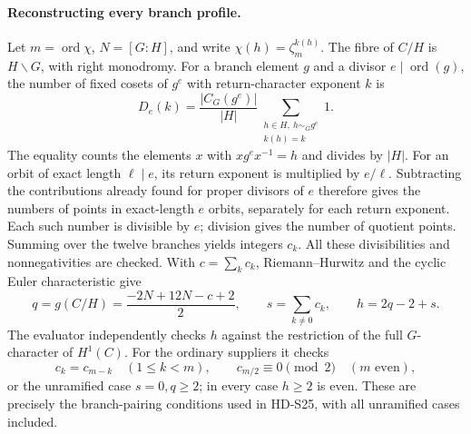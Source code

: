 \paragraph{Reconstructing every branch profile.}
Let \(m=\operatorname{ord}\chi\), \(N=[G:H]\), and write
\(\chi(h)=\zeta_m^{k(h)}\). The fibre of \(C/H\) is \(H\backslash G\),
with right monodromy. For a branch element \(g\) and a divisor
\(e\mid\operatorname{ord}(g)\), the number of fixed cosets of
\(g^e\) with return-character exponent \(k\) is
\[
 D_e(k)=\frac{|C_G(g^e)|}{|H|}
       \sum_{\substack{h\in H,\ h\sim_Gg^e\\k(h)=k}}1.
\]
The equality counts the elements \(x\) with \(xg^ex^{-1}=h\)
and divides by \(|H|\). For an orbit of exact length \(\ell\mid e\),
its return exponent is multiplied by \(e/\ell\). Subtracting the
contributions already found for proper divisors of \(e\) therefore
gives the numbers of points in exact-length \(e\) orbits, separately
for each return exponent. Each such number is divisible by \(e\);
division gives the number of quotient points. Summing over the twelve
branches yields integers \(c_k\). All these divisibilities and
nonnegativities are checked.
With \(c=\sum_kc_k\), Riemann--Hurwitz and the cyclic Euler
characteristic give
\[
 q=g(C/H)=\frac{-2N+12N-c+2}{2},\qquad
 s=\sum_{k\ne0}c_k,\qquad h=2q-2+s.
\]
The evaluator independently checks \(h\) against the restriction of
the full \(G\)-character of \(H^1(C)\).
For the ordinary suppliers it checks
\[
 c_k=c_{m-k}\quad(1\le k<m),\qquad
 c_{m/2}\equiv0\pmod2\quad(m\text{ even}),
\]
or the unramified case \(s=0,q\ge2\); in every case \(h\ge2\)
is even. These are precisely the branch-pairing conditions used in
HD-S25, with all unramified cases included.

